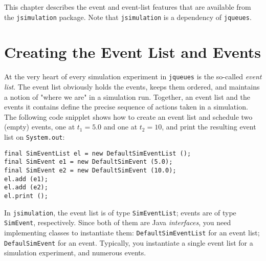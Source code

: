 This chapter describes the event and event-list features
  that are available from the \lstinline{jsimulation} package.
Note that \lstinline{jsimulation} is a dependency of \lstinline{jqueues}.

\section{Creating the Event List and Events}

At the very heart of every simulation experiment
  in \lstinline{jqueues}
  is the so-called {\em event list}.
The event list obviously holds the events,
  keeps them ordered,
  and maintains a notion of "where we are" in a simulation run.
Together, an event list and the events it contains define
  the precise sequence of actions taken in a simulation.
The following code snipplet shows how to create an event list and
  schedule two (empty) events, one at $t_{1}=5.0$ and one at $t_{2}=10$,
  and print the resulting event list on \lstinline{System.out}:
\begin{lstlisting}
final SimEventList el = new DefaultSimEventList ();
final SimEvent e1 = new DefaultSimEvent (5.0);
final SimEvent e2 = new DefaultSimEvent (10.0);
el.add (e1);
el.add (e2);
el.print ();
\end{lstlisting}
In \lstinline{jsimulation},
  the event list is of type \lstinline{SimEventList};
  events are of type \lstinline{SimEvent},
  respectively.
Since both of them are Java {\em interfaces}, you need implementing classes
  to instantiate them: \lstinline{DefaultSimEventList} for an event list;
  \lstinline{DefaulSimEvent} for an event.
Typically,
  you instantiate a single event list for a simulation experiment,
  and numerous events.

